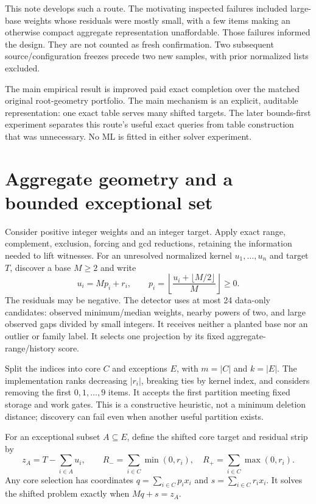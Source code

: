 \documentclass[10pt,english]{article}
\begin{document}
This note develops such a route. The motivating inspected failures included large-base weights whose residuals were mostly small, with a few items making an otherwise compact aggregate representation unaffordable. Those failures informed the design. They are not counted as fresh confirmation. Two subsequent source/configuration freezes precede two new samples, with prior normalized lists excluded.

The main empirical result is improved paid exact completion over the matched original root-geometry portfolio. The main mechanism is an explicit, auditable representation: one exact table serves many shifted targets. The later bounds-first experiment separates this route's useful exact queries from table construction that was unnecessary. No ML is fitted in either solver experiment.

\section{Aggregate geometry and a bounded exceptional set}
Consider positive integer weights and an integer target. Apply exact range, complement, exclusion, forcing and gcd reductions, retaining the information needed to lift witnesses. For an unresolved normalized kernel $u_1,\ldots,u_n$ and target $T$, discover a base $M\ge2$ and write
$$
u_i=Mp_i+r_i,\qquad
p_i=\left\lfloor\frac{u_i+\lfloor M/2\rfloor}{M}\right\rfloor\ge0.
$$
The residuals may be negative. The detector uses at most 24 data-only candidates: observed minimum/median weights, nearby powers of two, and large observed gaps divided by small integers. It receives neither a planted base nor an outlier or family label. It selects one projection by its fixed aggregate-range/history score.

Split the indices into core $C$ and exceptions $E$, with $m=|C|$ and $k=|E|$. The implementation ranks decreasing $|r_i|$, breaking ties by kernel index, and considers removing the first $0,1,\ldots,9$ items. It accepts the first partition meeting fixed storage and work gates. This is a constructive heuristic, not a minimum deletion distance; discovery can fail even when another useful partition exists.

For an exceptional subset $A\subseteq E$, define the shifted core target and residual strip by
$$
z_A=T-\sum_{i\in A}u_i,\qquad
R_-=\sum_{i\in C}\min(0,r_i),\quad
R_+=\sum_{i\in C}\max(0,r_i).
$$
Any core selection has coordinates $q=\sum_{i\in C}p_ix_i$ and $s=\sum_{i\in C}r_ix_i$. It solves the shifted problem exactly when $Mq+s=z_A$.
\end{document}
